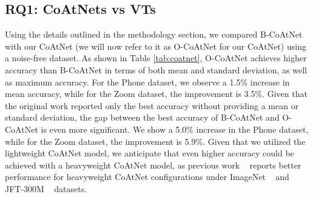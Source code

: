 \subsection{RQ1: CoAtNets vs VTs}
Using the details outlined in the methodology section, we compared B-CoAtNet with our CoAtNet (we will now refer to it as O-CoAtNet for our CoAtNet) using a noise-free dataset. As shown in Table \ref{tab:coatnet}, O-CoAtNet achieves higher accuracy than B-CoAtNet in terms of both mean and standard deviation, as well as maximum accuracy.
For the Phone dataset, we observe a 1.5\% increase in mean accuracy, while for the Zoom dataset, the improvement is 3.5\%. Given that the original work reported only the best accuracy without providing a mean or standard deviation, the gap between the best accuracy of B-CoAtNet and O-CoAtNet is even more significant. We show a 5.0\% increase in the Phone dataset, while for the Zoom dataset, the improvement is 5.9\%.
Given that we utilized the lightweight CoAtNet model, we anticipate that even higher accuracy could be achieved with a heavyweight CoAtNet model, as previous work ~\cite{dai2021coatnet} reports better performance for heavyweight CoAtNet configurations under ImageNet ~\cite{5206848} and JFT-300M ~\cite{sun2017revisiting} datasets.
\begin{table}[htbp]
    \centering
    \vspace{0.2em}
    \caption{Summary statistics for B-CoAtNet vs O-CoAtNet on the noise-free Phone and Zoom datasets. For our CoAtNet, the mean and standard deviation were calculated based on results from five different seeds. Note that B-CoAtNet only reports the best accuracy without providing standard deviations or parameter sizes, the latter of which is marked as `unknown' in the table.}
    \label{tab:coatnet}
\end{table}
\par
